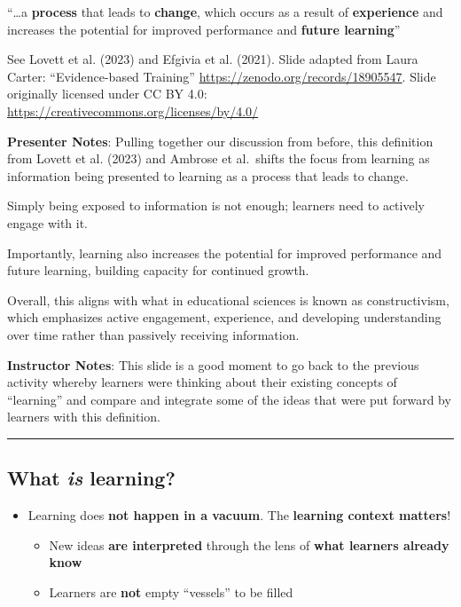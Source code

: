 \documentclass[
  letterpaper,
  DIV=11,
  numbers=noendperiod]{scrartcl}
\providecommand{\tightlist}{%
  \setlength{\itemsep}{0pt}\setlength{\parskip}{0pt}}
\begin{document}
``\ldots a \textbf{process} that leads to \textbf{change}, which occurs
as a result of \textbf{experience} and increases the potential for
improved performance and \textbf{future learning}''

See Lovett et al. (2023) and Efgivia et al. (2021). Slide adapted from
Laura Carter: ``Evidence-based Training''
\url{https://zenodo.org/records/18905547}. Slide originally licensed
under CC BY 4.0: \url{https://creativecommons.org/licenses/by/4.0/}

\textbf{Presenter Notes}: Pulling together our discussion from before,
this definition from Lovett et al. (2023) and Ambrose et al.~shifts the
focus from learning as information being presented to learning as a
process that leads to change.

Simply being exposed to information is not enough; learners need to
actively engage with it.

Importantly, learning also increases the potential for improved
performance and future learning, building capacity for continued growth.

Overall, this aligns with what in educational sciences is known as
constructivism, which emphasizes active engagement, experience, and
developing understanding over time rather than passively receiving
information.

\textbf{Instructor Notes}: This slide is a good moment to go back to the
previous activity whereby learners were thinking about their existing
concepts of ``learning'' and compare and integrate some of the ideas
that were put forward by learners with this definition.

\begin{center}\rule{0.5\linewidth}{0.5pt}\end{center}

\subsection{\texorpdfstring{What \emph{is}
learning?}{What is learning?}}\label{what-is-learning-1}

\begin{itemize}
\tightlist
\item
  Learning does \textbf{not happen in a vacuum}. The \textbf{learning
  context matters}!

  \begin{itemize}
  \tightlist
  \item
    New ideas \textbf{are interpreted} through the lens of \textbf{what
    learners already know}
  \item
    Learners are \textbf{not} empty ``vessels'' to be filled
  \end{itemize}
\end{itemize}
\end{document}
